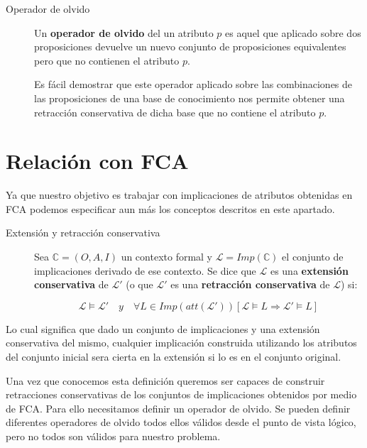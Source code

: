  	\begin{description}
 		\item[Operador de olvido]  	
	 		Un \textbf{operador de olvido} del un atributo $p$ es aquel que aplicado sobre dos proposiciones devuelve un 
	 		nuevo conjunto de proposiciones equivalentes pero que no contienen el atributo $p$.
	 		
	 		Es fácil demostrar que este operador aplicado sobre las combinaciones de las proposiciones de una base de conocimiento
	 		nos permite obtener una retracción conservativa de dicha base que no contiene el atributo $p$.
 	\end{description}
	 		
 	
\section*{Relación con FCA} 	

	Ya que nuestro objetivo es trabajar con implicaciones de atributos obtenidas en FCA podemos especificar aun más los conceptos descritos en este apartado.
	
	\begin{description}
		\item[Extensión y retracción conservativa] 
			 Sea $\mathbb{C} = (O,A,I)$ un contexto formal y $\mathcal{L} = Imp(\mathbb{C})$ el conjunto de implicaciones derivado de ese contexto. Se dice que $\mathcal{L}$ es una \textbf{extensión conservativa} de $\mathcal{L}'$ (o que $\mathcal{L}'$ es una \textbf{retracción conservativa} de $\mathcal{L}$) si:
			 
			 \[ \mathcal{L} \models \mathcal{L}' \quad y \quad \forall L \in Imp(att(\mathcal{L}')) [\mathcal{L} \models L \Longrightarrow \mathcal{L}' \models L]  \]
	\end{description}
	
	Lo cual significa que dado un conjunto de implicaciones y una extensión conservativa del mismo, cualquier implicación construida utilizando los atributos del conjunto inicial sera cierta en la extensión si lo es en el conjunto original.
	
	Una vez que conocemos esta definición queremos ser capaces de construir retracciones conservativas de los conjuntos de implicaciones obtenidos por medio de FCA. Para ello necesitamos definir un operador de olvido. Se pueden definir diferentes operadores de olvido todos ellos válidos desde el punto de vista lógico, pero no todos son válidos para nuestro problema.
	
